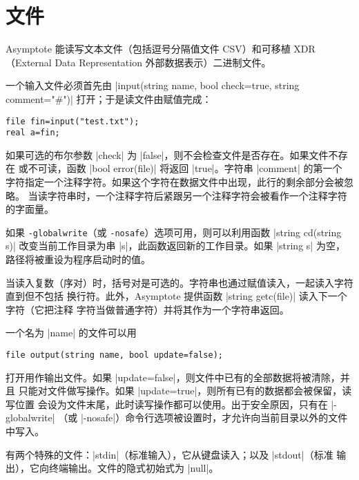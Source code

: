 \documentclass{ctexbook}
\newcommand*\prgname[1]{\textsf{#1}}
\begin{document}
\section{文件}

\prgname{Asymptote} 能读写文本文件（包括逗号分隔值文件 CSV）和可移植 XDR
（External Data Representation 外部数据表示）二进制文件。

一个输入文件必须首先由 |input(string name, bool check=true, string comment="#")|
打开；于是读文件由赋值完成：
\begin{lstlisting}
file fin=input("test.txt");
real a=fin;
\end{lstlisting}

如果可选的布尔参数 |check| 为 |false|，则不会检查文件是否存在。如果文件不存在
或不可读，函数 |bool error(file)| 将返回 |true|。字符串 |comment| 的第一个
字符指定一个注释字符。如果这个字符在数据文件中出现，此行的剩余部分会被忽略。
当读字符串时，一个注释字符后紧跟另一个注释字符会被看作一个注释字符的字面量。

如果 \verb=-globalwrite=（或 \verb=-nosafe=）选项可用，则可以利用函数
|string cd(string s)| 改变当前工作目录为串 |s|，此函数返回新的工作目录。如果
|string s| 为空，路径将被重设为程序启动时的值。

当读入复数（序对）时，括号对是可选的。字符串也通过赋值读入，一起读入字符直到但不包括
换行符。此外，\prgname{Asymptote} 提供函数 |string getc(file)| 读入下一个字符（它把注释
字符当做普通字符）并将其作为一个字符串返回。

一个名为 |name| 的文件可以用
\begin{lstlisting}
file output(string name, bool update=false);
\end{lstlisting}
打开用作输出文件。如果 |update=false|，则文件中已有的全部数据将被清除，并且
只能对文件做写操作。如果 |update=true|，则所有已有的数据都会被保留，读写位置
会设为文件末尾，此时读写操作都可以使用。出于安全原因，只有在 |-globalwrite|
（或 |-nosafe|）命令行选项被设置时，才允许向当前目录以外的文件中写入。

有两个特殊的文件：|stdin|（标准输入），它从键盘读入；以及 |stdout|（标准
输出），它向终端输出。文件的隐式初始式为 |null|。
\end{document}
